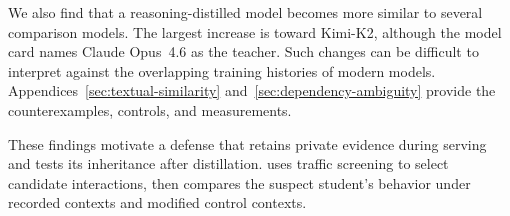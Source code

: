 We also find that a reasoning-distilled model becomes more similar to several
comparison models. The largest increase is toward Kimi-K2, although the
model card names Claude Opus~4.6 as the teacher. Such changes can be difficult
to interpret against the overlapping training histories of modern models.
Appendices~\ref{sec:textual-similarity} and~\ref{sec:dependency-ambiguity}
provide the counterexamples, controls, and measurements.

These findings motivate a defense that retains private evidence during
serving and tests its inheritance after distillation. \name{} uses traffic
screening to select candidate interactions, then compares the suspect
student's behavior under recorded contexts and modified control contexts.
